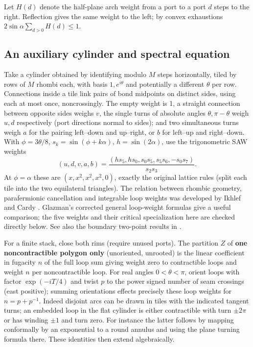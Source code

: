 Let $H(d)$ denote the half-plane arch weight from a port to a port $d$ steps to the right. Reflection gives the same weight to the left; by convex exhaustions $2\sin\alpha\sum_{d>0}H(d)\le1$.

\subsection{An auxiliary cylinder and spectral equation}
Take a cylinder obtained by identifying modulo $M$ steps horizontally, tiled by rows of $M$ rhombi each, with basis $1,e^{i\theta}$ and potentially a different $\theta$ per row. Connections inside a tile link pairs of bond midpoints on distinct sides, using each at most once, noncrossingly. The empty weight is 1, a straight connection between opposite sides weighs $v$, the single turns of absolute angles $\theta,\pi-\theta$ weigh $u,d$ respectively (port directions normal to sides); and two simultaneous turns weigh $a$ for the pairing left--down and up--right, or $b$ for left--up and right--down. With $\phi=3\theta/8$, $s_k=\sin(\phi+k\alpha)$, $h=\sin(2\alpha)$, use the trigonometric SAW weights
\[
(u,d,v,a,b)=\frac{(h s_5,h s_0,s_0s_5,s_5s_6,-s_0s_7)}{s_2s_3}.
\]
At $\phi=\alpha$ these are $(x,x^2,x^2,x^2,0)$, exactly the original lattice rules (split each tile into the two equilateral triangles). The relation between rhombic geometry, parafermionic cancellation and
integrable loop weights was developed by Ikhlef and Cardy
\cite{IkhlefCardy2009}. Glazman's corrected general loop-weight formulas
\cite[Section~5]{Glazman2015} give a useful comparison; the five weights
and their critical specialization here are checked directly below.
See also the boundary two-point results in \cite{GlazmanManolescu2017}.

For a finite stack, close both rims (require unused ports). The partition $Z$ of \textbf{one noncontractible polygon only} (unoriented, unrooted) is the linear coefficient in fugacity $n$ of the full loop sum giving weight zero to contractible loops and weight $n$ per noncontractible loop. For real angles $0<\theta<\pi$, orient loops with factor $\exp(-iT/4)$ and twist $p$ to the power signed number of seam crossings (east positive); summing orientations effects precisely these loop weights for $n=p+p^{-1}$. Indeed disjoint arcs can be drawn in tiles with the indicated tangent turns; an embedded loop in the flat cylinder is either contractible with turn $\pm2\pi$ or has winding $\pm1$ and turn zero. For instance the latter follows by mapping conformally by an exponential to a round annulus and using the plane turning formula there. These identities then extend algebraically. 

